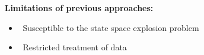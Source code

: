 \begin{block}{\large {}\vphantom{Introduction}}
\begin{columns}[t]
\begin{column}{.02\linewidth}\end{column}
\begin{column}{0.96\linewidth}
\vskip15pt
\textbf{Limitations of previous approaches:}
\begin{adjustwidth}{0.5cm}{0.5cm}
\begin{itemize}
\item \ Susceptible to the \alert{state space explosion} problem
\item \ \alert{Restricted treatment of data}
\end{itemize}
\end{adjustwidth}
\end{column}
\begin{column}{.02\linewidth}\end{column}
\end{columns}
\end{block}	